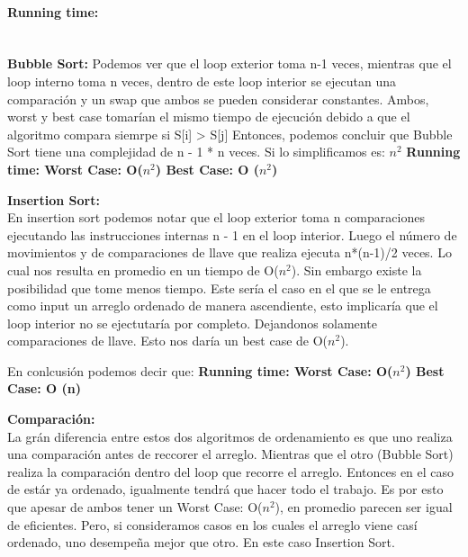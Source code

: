 \documentclass{article}
\begin{document}
\paragraph{Running time:} ~\\ \newline
\textbf{Bubble Sort:} \newline
Podemos ver que el loop exterior toma n-1 veces, mientras que el loop interno toma n veces, dentro de este loop interior se ejecutan una comparación y un swap que ambos se pueden considerar constantes. \newline
Ambos, worst y best case tomarían el mismo tiempo de ejecución debido a que el algoritmo compara siemrpe si S[i] > S[j] \newline
Entonces, podemos concluir que Bubble Sort tiene una complejidad de  n - 1 * n veces. Si lo simplificamos es: $n^2$ \newline
\textbf{Running time:  Worst Case: O($n^2$) Best Case: O ($n^2$)} \bigskip \newline

\textbf{Insertion Sort:}~\\ \newline
En insertion sort podemos notar que el loop exterior toma n comparaciones ejecutando las instrucciones internas n - 1 en el loop interior. Luego el número de movimientos  y de comparaciones de llave que realiza ejecuta n*(n-1)/2 veces.  Lo cual nos resulta en promedio en un tiempo de O($n^2$). Sin embargo existe la posibilidad que tome menos tiempo. Este sería el caso en el que se le entrega como input un arreglo ordenado de manera ascendiente, esto implicaría que el loop interior no se ejectutaría por completo. Dejandonos solamente comparaciones de llave. Esto nos daría un best case de O($n^2$). \newline

En conlcusión podemos decir que: \newline
\textbf{Running time:  Worst Case: O($n^2$) Best Case: O (n)} \bigskip \newline


\textbf{Comparación:}~\\ \newline
La grán diferencia entre estos dos algoritmos de ordenamiento es que uno realiza una comparación antes de reccorer el arreglo. Mientras que el otro (Bubble Sort) realiza la comparación dentro del loop que recorre el arreglo. Entonces en el caso de estár ya ordenado, igualmente tendrá que hacer todo el trabajo. 
Es por esto que apesar de ambos tener un Worst Case: O($n^2$), en promedio parecen ser igual de eficientes. Pero, si consideramos casos en los cuales el arreglo viene casí ordenado, uno desempeña mejor que otro. En este caso Insertion Sort. 
\end{document}
